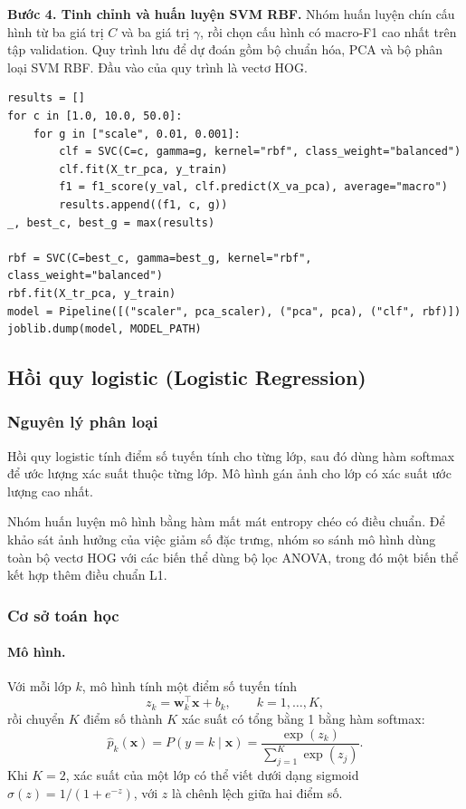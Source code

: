 \textbf{Bước 4. Tinh chỉnh và huấn luyện SVM RBF.} Nhóm huấn luyện chín cấu hình từ ba giá trị $C$ và ba giá trị $\gamma$, rồi chọn cấu hình có macro-F1 cao nhất trên tập validation. Quy trình lưu để dự đoán gồm bộ chuẩn hóa, PCA và bộ phân loại SVM RBF. Đầu vào của quy trình là vectơ HOG.

\begin{lstlisting}[caption={Tinh chỉnh và lưu SVM RBF (rút gọn)},label={lst:rbf}]
results = []
for c in [1.0, 10.0, 50.0]:
    for g in ["scale", 0.01, 0.001]:
        clf = SVC(C=c, gamma=g, kernel="rbf", class_weight="balanced")
        clf.fit(X_tr_pca, y_train)
        f1 = f1_score(y_val, clf.predict(X_va_pca), average="macro")
        results.append((f1, c, g))
_, best_c, best_g = max(results)

rbf = SVC(C=best_c, gamma=best_g, kernel="rbf", class_weight="balanced")
rbf.fit(X_tr_pca, y_train)
model = Pipeline([("scaler", pca_scaler), ("pca", pca), ("clf", rbf)])
joblib.dump(model, MODEL_PATH)
\end{lstlisting}

\subsection{Hồi quy logistic (Logistic Regression)}
\label{sec:lr}

\subsubsection{Nguyên lý phân loại}

Hồi quy logistic tính điểm số tuyến tính cho từng lớp, sau đó dùng hàm softmax để ước lượng xác suất thuộc từng lớp. Mô hình gán ảnh cho lớp có xác suất ước lượng cao nhất.

Nhóm huấn luyện mô hình bằng hàm mất mát entropy chéo có điều chuẩn. Để khảo sát ảnh hưởng của việc giảm số đặc trưng, nhóm so sánh mô hình dùng toàn bộ vectơ HOG với các biến thể dùng bộ lọc ANOVA, trong đó một biến thể kết hợp thêm điều chuẩn L1.

\subsubsection{Cơ sở toán học}

\paragraph{Mô hình.} Với mỗi lớp $k$, mô hình tính một điểm số tuyến tính
\[
  z_k = \mathbf{w}_k^\top \mathbf{x} + b_k , \qquad k = 1, \dots, K ,
\]
rồi chuyển $K$ điểm số thành $K$ xác suất có tổng bằng 1 bằng hàm softmax:
\begin{equation}
  \hat{p}_k(\mathbf{x}) = P(y = k \mid \mathbf{x}) = \frac{\exp(z_k)}{\sum_{j=1}^{K} \exp(z_j)} .
  \label{eq:softmax}
\end{equation}
Khi $K = 2$, xác suất của một lớp có thể viết dưới dạng sigmoid $\sigma(z) = 1/(1 + e^{-z})$, với $z$ là chênh lệch giữa hai điểm số.

